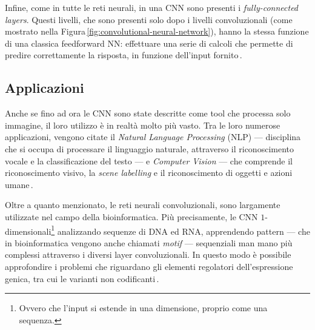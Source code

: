 Infine, come in tutte le reti neurali, in una \acs{CNN} sono presenti i \textit{fully-connected layers}. Questi livelli, che sono presenti solo dopo i livelli convoluzionali (come mostrato nella Figura\,\ref{fig:convolutional-neural-network}), hanno la stessa funzione di una classica feedforward \acs{NN}: effettuare una serie di calcoli che permette di predire correttamente la risposta, in funzione dell'input fornito\,\cite{aggarwal2018neural, o2015introduction}.

\subsection{Applicazioni}

Anche se fino ad ora le \acs{CNN} sono state descritte come tool che processa solo immagine, il loro utilizzo è in realtà molto più vasto. Tra le loro numerose applicazioni, vengono citate il \textit{Natural Language Processing} (\acs{NLP}) — disciplina che si occupa di processare il linguaggio naturale, attraverso il riconoscimento vocale e la classificazione del testo — e \textit{Computer Vision} — che comprende il riconoscimento visivo, la \textit{scene labelling} e il riconoscimento di oggetti e azioni umane\,\cite{shamsaldin2019study, li2021survey, bhatt2021cnn}.

Oltre a quanto menzionato, le reti neurali convoluzionali, sono largamente utilizzate nel campo della bioinformatica. Più precisamente, le \acs{CNN} $1$-dimensionali\footnote{Ovvero che l'input si estende in una dimensione, proprio come una sequenza.} analizzando sequenze di \acs{DNA} ed \acs{RNA}, apprendendo pattern — che in bioinformatica vengono anche chiamati \textit{motif} — sequenziali man mano più complessi attraverso i diversi layer convoluzionali. In questo modo è possibile approfondire i problemi che riguardano gli elementi regolatori dell'espressione genica, tra cui le varianti non codificanti\,\cite{min2017deep}.
